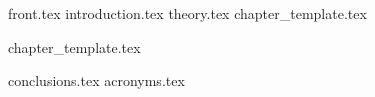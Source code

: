 \documentclass[10pt,twoside,openright, final]{report}
\begin{document}
{front.tex}
\setcounter{page}{0}
\listoftodos %
\tableofcontents
\setcounter{page}{0}
{introduction.tex}
{theory.tex}
{chapter_template.tex}



{chapter_template.tex}

{conclusions.tex}
\appendix
{acronyms.tex}


\printbibliography
{}
\end{document}
